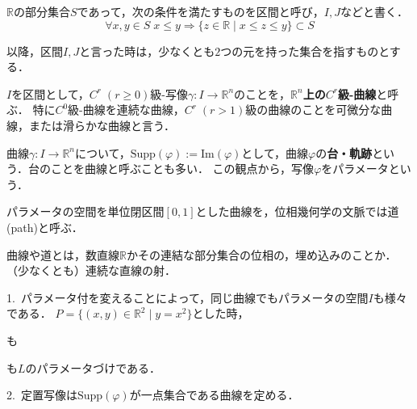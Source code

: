 \documentclass[uplatex, dvipdfmx]{jsreport}
\begin{document}
\begin{definition}[区間]
    $\mathbb{R}$の部分集合$S$であって，次の条件を満たすものを区間と呼び，$I,J$などと書く．
    \[ \forall x,y\in S\; x\le y\Rightarrow \{ z\in\mathbb{R}\mid x\le z\le y \}\subset S \]
\end{definition}
以降，区間$I,J$と言った時は，少なくとも$2$つの元を持った集合を指すものとする．

\begin{definition}[曲線]\label{def-curve}
    $I$を区間として，$C^r\;(r\ge 0)$級-写像$\gamma:I\to\mathbb{R}^n$のことを，\textbf{$\mathbb{R}^n$上の$C^r$級-曲線}と呼ぶ．
    特に$C^0$級-曲線を連続な曲線，$C^r\;(r>1)$級の曲線のことを可微分な曲線，または滑らかな曲線と言う．
\end{definition}
\begin{remark}[台，パラメータ]
    曲線$\gamma:I\to\mathbb{R}^n$について，$\mathrm{Supp}(\varphi):=\mathrm{Im}(\varphi)$として，曲線$\varphi$の\textbf{台・軌跡}という．台のことを曲線と呼ぶことも多い．
    この観点から，写像$\varphi$をパラメータという．

    パラメータの空間を単位閉区間$[0,1]$とした曲線を，位相幾何学の文脈では道(path)と呼ぶ．

    曲線や道とは，数直線$\mathbb{R}$かその連結な部分集合の位相の，埋め込みのことか．（少なくとも）連続な直線の射．
\end{remark}

\begin{example}\rm{}\label{examples-various-curves}
    1.\, パラメータ付を変えることによって，同じ曲線でもパラメータの空間$I$も様々である．
    $P=\{(x,y)\in\mathbb{R}^2\mid y=x^2\}$とした時，
    \begin{center}\end{center}
    も
    \begin{center}\end{center}
    も$L$のパラメータづけである．

    2.\, 定置写像は$\mathrm{Supp}(\varphi)$が一点集合である曲線を定める．
\end{example}
\end{document}
